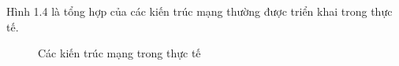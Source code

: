 Hình 1.4 là tổng hợp của các kiến trúc mạng thường được triển khai trong thực tế.
\linebreak 
\begin{figure}[htb]
	\caption{\label{fig:my-label} Các kiến trúc mạng trong thực tế}
\end{figure}

